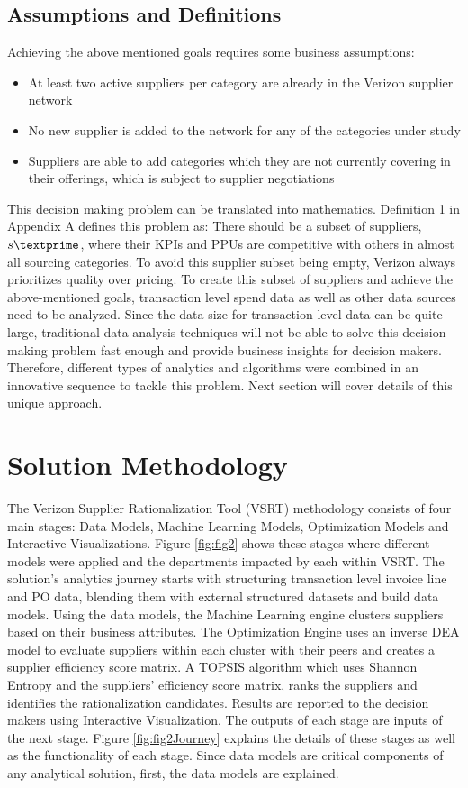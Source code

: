 \documentclass[inte,nonblindrev]{informs3} %
\begin{document}
\subsection{Assumptions and Definitions}
Achieving the above mentioned goals requires some business assumptions:
\begin{itemize}
\item At least two active suppliers per category are already in the Verizon supplier network
\item No new supplier is added to the network for any of the categories under study
\item Suppliers are able to add categories which they are not currently covering in their offerings, which is subject to supplier negotiations
\end{itemize}

This decision making problem can be translated into mathematics. Definition 1 in Appendix A defines this problem as: There should be a subset of suppliers, $s\textprime$, where their KPIs and PPUs are competitive with others in almost all sourcing categories. To avoid this supplier subset being empty, Verizon always prioritizes quality over pricing. To create this subset of suppliers and achieve the above-mentioned goals, transaction level spend data as well as other data sources need to be analyzed. Since the data size for transaction level data can be quite large, traditional data analysis techniques will not be able to solve this decision making problem fast enough and provide business insights for decision makers. Therefore, different types of analytics and algorithms were combined in an innovative sequence to tackle this problem. Next section will cover details of this unique approach.

\section{Solution Methodology} 
The Verizon Supplier Rationalization Tool (VSRT) methodology consists of four main stages: Data Models, Machine Learning Models, Optimization Models and Interactive Visualizations. Figure \ref{fig:fig2} shows these stages where different models were applied and the departments impacted by each within VSRT. The solution's analytics journey starts with structuring transaction level invoice line and PO data, blending them with external structured datasets and build data models. Using the data models, the Machine Learning engine clusters suppliers based on their business attributes. The Optimization Engine uses an inverse DEA model to evaluate suppliers within each cluster with their peers and creates a supplier efficiency score matrix. A TOPSIS algorithm which uses Shannon Entropy and the suppliers' efficiency score matrix, ranks the suppliers and identifies the rationalization candidates. Results are reported to the decision makers using Interactive Visualization. The outputs of each stage are inputs of the  next stage. Figure \ref{fig:fig2Journey} explains the details of these stages as well as the functionality of each stage. Since data models are critical components of any analytical solution, first, the data models are explained.
\end{document}
